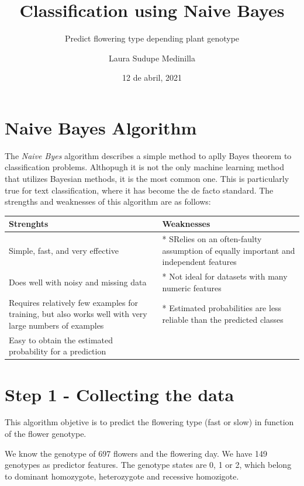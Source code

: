 \documentclass[
]{article}
\title{Classification using Naive Bayes}
\subtitle{Predict flowering type depending plant genotype}
\author{Laura Sudupe Medinilla}
\date{12 de abril, 2021}
\begin{document}
\maketitle

{
\setcounter{tocdepth}{2}
\tableofcontents
}
\pagebreak

\hypertarget{naive-bayes-algorithm}{%
\section{Naive Bayes Algorithm}\label{naive-bayes-algorithm}}

The \emph{Naive Byes} algorithm describes a simple method to aplly Bayes
theorem to classification problems. Althopugh it is not the only machine
learning method that utilizes Bayesian methods, it is the most common
one. This is particularly true for text classification, where it has
become the de facto standard. The strengths and weaknesses of this
algorithm are as follows:

\begin{longtable}[]{@{}
  >{\raggedright\arraybackslash}p{}
  >{\raggedright\arraybackslash}p{}@{}}
\toprule
\textbf{Strenghts} & \textbf{Weaknesses} \\
\midrule
\endhead
* Simple, fast, and very effective & * SRelies on an often-faulty
assumption of equally important and independent features \\
* Does well with noisy and missing data & * Not ideal for datasets with
many numeric features \\
* Requires relatively few examples for training, but also works well
with very large numbers of examples & * Estimated probabilities are less
reliable than the predicted classes \\
* Easy to obtain the estimated probability for a prediction & \\
\bottomrule
\end{longtable}

\hypertarget{step-1---collecting-the-data}{%
\section{Step 1 - Collecting the
data}\label{step-1---collecting-the-data}}

This algorithm objetive is to predict the flowering type (fast or slow)
in function of the flower genotype.

We know the genotype of 697 flowers and the flowering day. We have 149
genotypes as predictor features. The genotype states are 0, 1 or 2,
which belong to dominant homozygote, heterozygote and recessive
homozigote.
\end{document}
